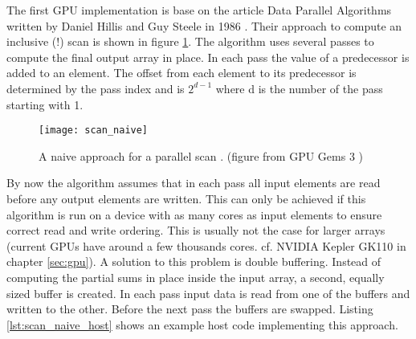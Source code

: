 The first GPU implementation is base on the article Data Parallel Algorithms written by Daniel Hillis and Guy Steele in 1986 \cite{scan_naive}. Their approach to compute an inclusive (!) scan is shown in figure \ref{fig:scan_naive}. The algorithm uses several passes to compute the final output array in place. In each pass the value of a predecessor is added to an element. The offset from each element to its predecessor is determined by the pass index and is $2^{d - 1}$ where d is the number of the pass starting with 1.

\vspace{0.5cm}
\begin{figure}[h]
\centering
\texttt{[image: scan\_naive]}
\caption{A naive approach for a parallel scan \cite{scan_naive}. (figure from GPU Gems 3 \cite{gpu_gems_3_chapter_39})}
\label{fig:scan_naive}
\end{figure}

By now the algorithm assumes that in each pass all input elements are read before any output elements are written. This can only be achieved if this algorithm is run on a device with as many cores as input elements to ensure correct read and write ordering. This is usually not the case for larger arrays (current GPUs have around a few thousands cores. cf. NVIDIA Kepler GK110 in chapter \ref{sec:gpu}). A solution to this problem is double buffering. Instead of computing the partial sums in place inside the input array, a second, equally sized buffer is created. In each pass input data is read from one of the buffers and written to the other. Before the next pass the buffers are swapped.
Listing \ref{lst:scan_naive_host} shows an example host code implementing this approach.



